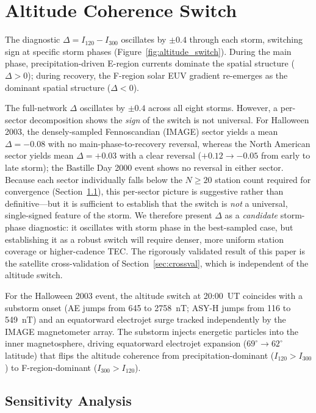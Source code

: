 \documentclass[11pt,letterpaper]{article}
\begin{document}
\section{Altitude Coherence Switch}

The diagnostic $\Delta = I_{120} - I_{300}$ oscillates by $\pm 0.4$ through each
storm, switching sign at specific storm phases
(Figure~\ref{fig:altitude_switch}). During the main phase, precipitation-driven
E-region currents dominate the spatial structure ($\Delta > 0$); during recovery,
the F-region solar EUV gradient re-emerges as the dominant spatial structure
($\Delta < 0$).

The full-network $\Delta$ oscillates by $\pm 0.4$ across all eight storms.
However, a per-sector decomposition shows the \emph{sign} of the switch is not
universal. For Halloween 2003, the densely-sampled Fennoscandian (IMAGE) sector
yields a mean $\Delta = -0.08$ with no main-phase-to-recovery reversal, whereas
the North American sector yields mean $\Delta = +0.03$ with a clear reversal
($+0.12 \to -0.05$ from early to late storm); the Bastille Day 2000 event shows
no reversal in either sector. Because each sector individually falls below the
$N \geq 20$ station count required for convergence
(Section~\ref{sec:sensitivity}), this per-sector picture is suggestive rather
than definitive---but it is sufficient to establish that the switch is
\emph{not} a universal, single-signed feature of the storm. We therefore present
$\Delta$ as a \emph{candidate} storm-phase diagnostic: it oscillates with storm
phase in the best-sampled case, but establishing it as a robust switch will
require denser, more uniform station coverage or higher-cadence TEC. The
rigorously validated result of this paper is the satellite cross-validation of
Section~\ref{sec:crossval}, which is independent of the altitude switch.

For the Halloween 2003 event, the altitude switch at 20:00~UT coincides with a
substorm onset (AE jumps from 645 to 2758~nT; ASY-H jumps from 116 to 549~nT)
and an equatorward electrojet surge tracked independently by the IMAGE
magnetometer array. The substorm injects energetic particles into the inner
magnetosphere, driving equatorward electrojet expansion ($69^{\circ} \to
62^{\circ}$ latitude) that flips the altitude coherence from
precipitation-dominant ($I_{120} > I_{300}$) to F-region-dominant ($I_{300} >
I_{120}$).

\subsection{Sensitivity Analysis}
\label{sec:sensitivity}
\end{document}

